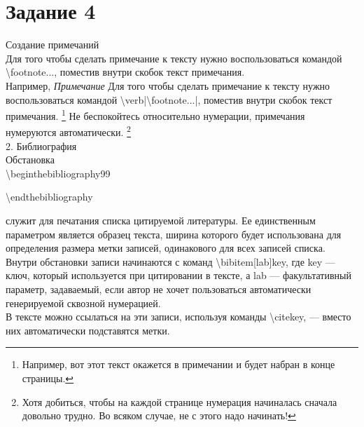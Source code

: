 \documentclass[a4paper,12pt]{article} %
\begin{document}
\section{Задание 4}

Создание примечаний\\
Для того чтобы сделать примечание к тексту нужно воспользоваться командой \textbackslash footnote{...}, поместив внутри скобок текст примечания.\\
Например,
{\it Примечание} Для того чтобы сделать примечание к тексту нужно воспользоваться командой  \textbackslash verb|\textbackslash footnote{...}|, поместив внутри скобок текст примечания. \footnote{Например, вот этот текст окажется в примечании и будет набран в конце страницы.} Не беспокойтесь относительно нумерации, примечания нумеруются автоматически. \footnote{Хотя добиться, чтобы на каждой странице нумерация начиналась сначала довольно трудно. Во всяком случае, не с этого надо начинать!}\\
2. Библиография\\
Обстановка \\
\textbackslash begin{thebibliography}{99}

\textbackslash end{thebibliography}

служит для печатания списка цитируемой литературы. Ее единственным параметром  является образец текста, ширина которого будет использована для определения размера метки записей, одинакового для всех записей списка.\\
Внутри обстановки записи начинаются с команд \textbackslash bibitem[lab]{key},  где key — ключ, который используется при цитировании в тексте, а  lab — факультативный параметр, задаваемый, если автор не хочет пользоваться автоматически генерируемой сквозной нумерацией.\\
В тексте можно ссылаться на эти записи, используя команды \textbackslash cite{key}, — вместо них автоматически подставятся метки.
\end{document}

